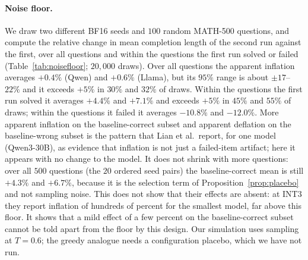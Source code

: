 \documentclass[11pt,a4paper]{article}
\begin{document}
\paragraph{Noise floor.} We draw two different BF16 seeds and $100$ random MATH-500 questions, and compute the relative change in mean completion length of the second run against the first, over all questions and within the questions the first run solved or failed (Table~\ref{tab:noisefloor}; $20{,}000$ draws). Over all questions the apparent inflation averages $+0.4\%$ (Qwen) and $+0.6\%$ (Llama), but its $95\%$ range is about $\pm17$--$22\%$ and it exceeds $+5\%$ in $30\%$ and $32\%$ of draws. Within the questions the first run solved it averages $+4.4\%$ and $+7.1\%$ and exceeds $+5\%$ in $45\%$ and $55\%$ of draws; within the questions it failed it averages $-10.8\%$ and $-12.0\%$. More apparent inflation on the baseline-correct subset and apparent deflation on the baseline-wrong subset is the pattern that Lian et al.\ report, for one model (Qwen3-30B), as evidence that inflation is not just a failed-item artifact; here it appears with no change to the model. It does not shrink with more questions: over all $500$ questions (the $20$ ordered seed pairs) the baseline-correct mean is still $+4.3\%$ and $+6.7\%$, because it is the selection term of Proposition~\ref{prop:placebo} and not sampling noise. This does not show that their effects are absent: at INT3 they report inflation of hundreds of percent for the smallest model, far above this floor. It shows that a mild effect of a few percent on the baseline-correct subset cannot be told apart from the floor by this design. Our simulation uses sampling at $T=0.6$; the greedy analogue needs a configuration placebo, which we have not run.
\end{document}
